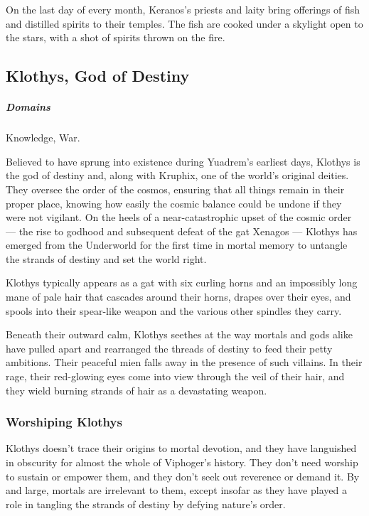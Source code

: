         On the last day of every month, Keranos's priests and laity bring offerings of fish and distilled spirits to their temples.
        The fish are cooked under a skylight open to the stars, with a shot of spirits thrown on the fire.

\subsection*{Klothys, God of Destiny} \label{ssec::klothys}
    \subparagraph{Domains} Knowledge, War.

    Believed to have sprung into existence during Yuadrem's earliest days, Klothys is the god of destiny and, along with Kruphix, one of the world's original deities.
    They oversee the order of the cosmos, ensuring that all things remain in their proper place, knowing how easily the cosmic balance could be undone if they were not vigilant.
    On the heels of a near-catastrophic upset of the cosmic order --- the rise to godhood and subsequent defeat of the gat Xenagos --- Klothys has emerged from the Underworld for the first time in mortal memory to untangle the strands of destiny and set the world right.

    Klothys typically appears as a gat with six curling horns and an impossibly long mane of pale hair that cascades around their horns, drapes over their eyes, and spools into their spear-like weapon and the various other spindles they carry.

    Beneath their outward calm, Klothys seethes at the way mortals and gods alike have pulled apart and rearranged the threads of destiny to feed their petty ambitions.
    Their peaceful mien falls away in the presence of such villains.
    In their rage, their red-glowing eyes come into view through the veil of their hair, and they wield burning strands of hair as a devastating weapon.

    \subsubsection{Worshiping Klothys}
        Klothys doesn't trace their origins to mortal devotion, and they have languished in obscurity for almost the whole of Viphoger's history.
        They don't need worship to sustain or empower them, and they don't seek out reverence or demand it.
        By and large, mortals are irrelevant to them, except insofar as they have played a role in tangling the strands of destiny by defying nature's order.

